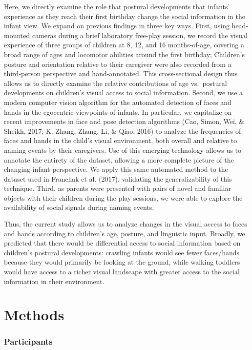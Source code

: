 \documentclass[english,man,floatsintext]{apa6}
\begin{document}
Here, we directly examine the role that postural developments that
infants' experience as they reach their first birthday change the social
information in the infant view. We expand on previous findings in three
key ways. First, using head-mounted cameras during a brief laboratory
free-play session, we record the visual experience of three groups of
children at 8, 12, and 16 months-of-age, covering a broad range of ages
and locomotor abilities around the first birthday; Children's posture
and orientation relative to their caregiver were also recorded from a
third-person perspective and hand-annotated. This cross-sectional design
thus allows us to directly examine the relative contributions of age
vs.~postural developments on children's visual access to social
information. Second, we use a modern computer vision algorithm for the
automated detection of faces and hands in the egocentric viewpoints of
infants. In particular, we capitalize on recent improvements in face and
pose detection algorithms (Cao, Simon, Wei, \& Sheikh, 2017; K. Zhang,
Zhang, Li, \& Qiao, 2016) to analyze the frequencies of faces and hands
in the child's visual environment, both overall and relative to naming
events by their caregivers. Use of this emerging technology allows us to
annotate the entirety of the dataset, allowing a more complete picture
of the changing infant perspective. We apply this same automated method
to the dataset used in Franchak et al. (2017), validating the
generalizability of this technique. Third, as parents were presented
with pairs of novel and familiar objects with their children during the
play sessions, we were able to explore the availability of social
signals during naming events.

Thus, the current study allows us to analyze changes in the visual
access to faces and hands according to children's age, posture, and
linguistic input. Broadly, we predicted that there would be differential
access to social information based on children's postural developments:
crawling infants would see fewer faces/hands because they would
primarily be looking at the ground, while walking toddlers would have
access to a richer visual landscape with greater access to the social
information in their environment.

\section{Methods}\label{methods}

\subsubsection{Participants}\label{participants}
\end{document}
